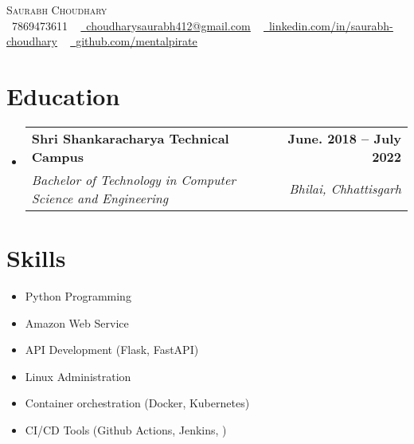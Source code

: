 \documentclass[letterpaper,11pt]{article}
\makeatletter
\newcommand{\resumeSubheading}[4]{
  \vspace{-2pt}\item
    \begin{tabular*}{1.0\textwidth}[t]{l@{\extracolsep{\fill}}r}
      \textbf{#1} & \textbf{\small #2} \\
      \textit{\small#3} & \textit{\small #4} \\
    \end{tabular*}\vspace{-7pt}
}
\newcommand{\resumeSubHeadingListStart}{\begin{itemize}[leftmargin=0.0in, label={}]}
\newcommand{\resumeSubHeadingListEnd}{\end{itemize}}
\makeatother
\begin{document}


\begin{center}
    {\Huge \scshape Saurabh Choudhary} \\ \vspace{1pt}
    \small \raisebox{-0.1\height}\faPhone\ 7869473611 ~ \href{mailto:choudharysaurabh412@gmail.com}{\raisebox{-0.2\height}\faEnvelope\  \underline{choudharysaurabh412@gmail.com}} ~ 
    \href{https://linkedin.com/in/saurabh-choudhary-379965192/}{\raisebox{-0.2\height}\faLinkedin\ \underline{linkedin.com/in/saurabh-choudhary}}  ~
    \href{https://github.com/mentalpirate}{\raisebox{-0.2\height}\faGithub\ \underline{github.com/mentalpirate}}
    \vspace{-8pt}
\end{center}


\section{Education}
  \resumeSubHeadingListStart
    \resumeSubheading
      {Shri Shankaracharya Technical Campus}{June. 2018 -- July 2022}
      {Bachelor of Technology in Computer Science and Engineering }{Bhilai, Chhattisgarh}
  \resumeSubHeadingListEnd

\section{Skills}
        \begin{multicols}{3}
            \begin{itemize}[itemsep=-5pt, parsep=3pt]
                \item\small Python Programming
                \item Amazon Web Service
                \item API Development (Flask, FastAPI)
                \item Linux Administration
                \item Container orchestration (Docker, Kubernetes)
                \item CI/CD Tools (Github Actions, Jenkins, )

            \end{itemize}
        \end{multicols}
        \vspace*{2.0\multicolsep}
\end{document}
